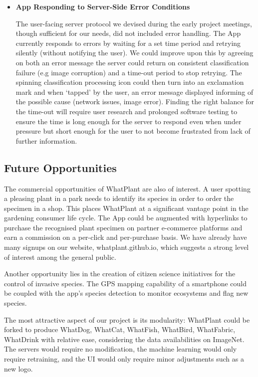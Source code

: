 \documentclass[a4paper,11pt]{article}
\begin{document}
\begin{description}
\begin{itemize}
\item \textbf{App Responding to Server-Side Error Conditions}

The user-facing server protocol we devised during the early project meetings, though sufficient for our needs, did not included error handling. The App currently responds to errors by waiting for a set time period and retrying silently (without notifying the user). We could improve upon this by agreeing on both an error message the server could return on consistent classification failure (e.g image corruption) and a time-out period to stop retrying. The spinning classification processing icon could then turn into an exclamation mark and when `tapped' by the user, an error message displayed informing of the possible cause (network issues, image error). Finding the right balance for the time-out will require user research and prolonged software testing to ensure the time is long enough for the server to respond even when under pressure but short enough for the user to not become frustrated from lack of further information.

\end{itemize}

\subsection{Future Opportunities}

The commercial opportunities of WhatPlant are also of interest. A user spotting a pleasing plant in a park needs to identify its species in order to order the specimen in a shop. This places WhatPlant at a significant vantage point in the gardening consumer life cycle. The App could be augmented with hyperlinks to purchase the recognised plant specimen on partner e-commerce platforms and earn a commission on a per-click and per-purchase basis. We have already have many signups on our website, whatplant.github.io, which suggests a strong level of interest among the general public.

\hspace{5 mm} Another opportunity lies in the creation of citizen science initiatives for the control of invasive species. The GPS mapping capability of a smartphone could be coupled with the app's species detection to monitor ecosystems and flag new species.

\hspace{5 mm} The most attractive aspect of our project is its modularity: WhatPlant could be forked to produce WhatDog, WhatCat, WhatFish, WhatBird, WhatFabric, WhatDrink with relative ease, considering the data availabilities on ImageNet. The servers would require no modification, the machine learning would only require retraining, and the UI would only require minor adjustments such as a new logo.


\end{description}
\end{document}
